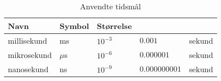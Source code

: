 \documentclass{article}
\begin{document}
\begin{table}[h]
\caption{Anvendte tidsmål}
\begin{tabular}{lllll}
\toprule
Navn &Symbol &Størrelse  &\\\midrule
millisekund&ms&$10^{-3}$&$0.001$&sekund\\
mikrosekund&$\mu$s&$10^{-6}$&$0.000001$&sekund\\	%
nanosekund&ns&$10^{-9}$&$0.000000001$&sekund\\\midrule
\end{tabular}
\end{table}
\end{document}

